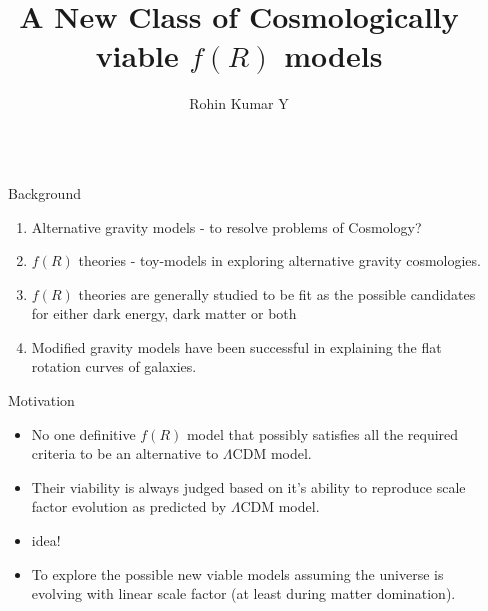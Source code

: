 \documentclass[final,hyperref={pdfpagelabels=false}]{beamer}
\title{\huge A New Class of Cosmologically viable $f(R)$ models} %
\author{Rohin Kumar Y} %
\institute{Department of Physics \& Astrophysics, University of Delhi} %
\begin{document}

\begin{frame}[t] %

\begin{columns}[t] %

\begin{column}{.02\textwidth}\end{column} %

\begin{column}{.465\textwidth} %


\begin{block}{Background}

\begin{enumerate}
	\item Alternative gravity models - to resolve problems of Cosmology?
	\item $f(R)$ theories - toy-models in exploring alternative gravity cosmologies.
	\item $f(R)$ theories are generally studied to be fit as the possible candidates for either dark energy, dark matter or both
	\item Modified gravity models have been successful in explaining the flat rotation curves of galaxies.
\end{enumerate}

\end{block}

            
\begin{block}{Motivation}

\begin{itemize}
		\item No one definitive $f(R)$ model that possibly satisfies all the required criteria to be an alternative to $\Lambda$CDM model.
\item Their viability is always judged based on it's ability to reproduce scale factor evolution as predicted by $\Lambda$CDM model.
\item idea!
\item To explore the possible new viable models assuming the universe is evolving with linear scale factor (at least during matter domination).
\end{itemize}


\end{block}
\end{column}
\end{columns}
\end{frame}
\end{document}
